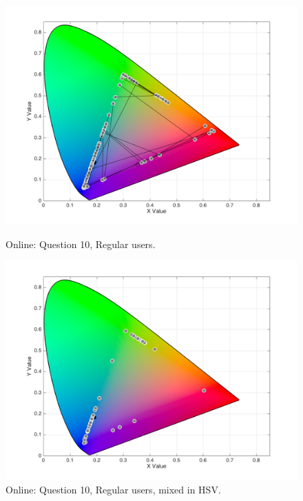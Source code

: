 \begin{figure}[htbp]
  \centering
  \vspace{-15pt}
  \begin{minipage}{0.4\textwidth}
    \centering
    \includegraphics[width=\textwidth]{images/results/10_online_regularUsers.png}
    \caption[Online: Answers for Question 10, from regular users.]{Online: Question 10, Regular users.}
    \label{fig:onlineregular_10}
  \end{minipage}
  \begin{minipage}{0.4\textwidth}
    \centering
    \includegraphics[width=\textwidth]{images/results/10_online_HSVresponses.png}
    \caption[Online: Answers for Question 10, from regular users, mixed in HSV Color Model.]{Online: Question 10, Regular users, mixed in HSV.}
    \label{fig:onlinehsvregular_10_1}
  \end{minipage}
  \vspace{-5pt}
\end{figure}
%
